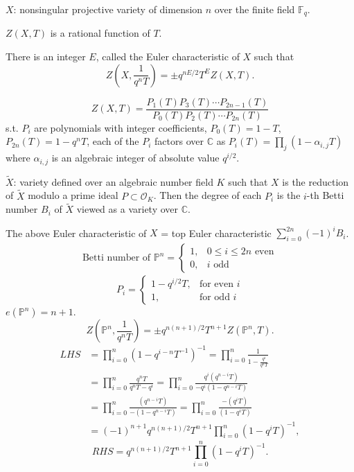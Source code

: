 $X$: nonsingular projective variety of dimension $n$ over the finite field $\mathbb{F}_q$.
\begin{theorem}[Rationality]
	$Z(X,T)$ is a rational function of $T$.
\end{theorem}
\begin{theorem}
	There is an integer $E$, called the Euler characteristic of $X$ such that 
	\[Z(X,\frac{1}{q^nT})=\pm q^{nE/2}T^EZ(X,T).\]
\end{theorem}
\begin{theorem}
	\[Z(X,T)=\frac{P_1(T)P_3(T)\cdots P_{2n-1}(T)}{P_0(T)P_2(T)\cdots P_{2n}(T)}\]
	s.t. $P_i$ are polynomials with integer coefficients, $P_0(T)=1-T$, $P_{2n}(T)=1-q^nT$, each of the $P_i$ factors over $\mathbb{C}$ as $P_i(T)=\prod_j (1-\alpha_{i,j}T)$ where $\alpha_{i,j}$ is an algebraic integer of absolute value $q^{i/2}$.
\end{theorem}
\begin{theorem}[Comparison]
	$\widetilde{X}$: variety defined over  an algebraic number field $K$ such that $X$ is the reduction of $\widetilde{X}$ modulo a prime ideal $P\subset \mathcal{O}_K$. Then the degree of each $P_i$ is the $i$-th Betti number $B_i$ of $\widetilde{X}$ viewed as a variety over $\mathbb{C}$.
\end{theorem}
The above Euler characteristic of $X$ = top Euler characteristic $\sum_{i=0}^{2n}(-1)^iB_i$.
\begin{gather*}
	\text{Betti number of } \mathbb{P}^n =\begin{cases}
		1,&0\leq i \leq 2n \text{ even}\\
		0,& i \text{ odd}
	\end{cases}
\end{gather*}
\begin{equation*}
	P_i=\begin{cases}
		1-q^{i/2}T,& \text{for even } i\\
		1,& \text{for odd } i
	\end{cases}
\end{equation*}
$e(\mathbb{P}^n)=n+1$.
\[Z(\mathbb{P}^n,\frac{1}{q^nT})=\pm q^{n(n+1)/2}T^{n+1}Z(\mathbb{P}^n,T).\]
\begin{align*}
LHS&=\prod_{i=0}^n (1-q^{i-n}T^{-1})^{-1}=\prod_{i=0}^n \frac{1}{1-\frac{q^i}{q^{n}T}}\\
&=\prod_{i=0}^n \frac{q^{n}T}{q^{n}T-q^i}=\prod_{i=0}^n \frac{q^i(q^{n-i}T)}{-q^{i}(1-q^{n-i}T)}\\
&=\prod_{i=0}^n \frac{(q^{n-i}T)}{-(1-q^{n-i}T)}=\prod_{i=0}^n \frac{-(q^{i}T)}{(1-q^{i}T)}\\
&=(-1)^{n+1}q^{n(n+1)/2}T^{n+1}\prod_{i=0}^n(1-q^iT)^{-1},
\end{align*}
\[RHS=q^{n(n+1)/2}T^{n+1}\prod_{i=0}^n(1-q^iT)^{-1}.\]
